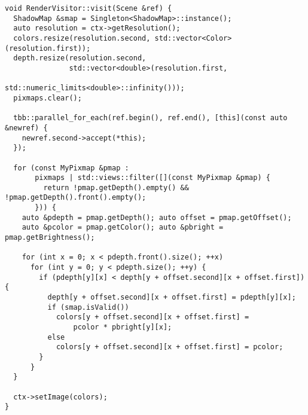 \renewcommand\thechapter{A}


\begin{lstlisting}[caption={Использование RenderVisitor на сцену}, label={lst:render_scene}]
void RenderVisitor::visit(Scene &ref) {
  ShadowMap &smap = Singleton<ShadowMap>::instance();
  auto resolution = ctx->getResolution();
  colors.resize(resolution.second, std::vector<Color>(resolution.first));
  depth.resize(resolution.second,
               std::vector<double>(resolution.first,
                                   std::numeric_limits<double>::infinity()));
  pixmaps.clear();

  tbb::parallel_for_each(ref.begin(), ref.end(), [this](const auto &newref) {
    newref.second->accept(*this);
  });

  for (const MyPixmap &pmap :
       pixmaps | std::views::filter([](const MyPixmap &pmap) {
         return !pmap.getDepth().empty() && !pmap.getDepth().front().empty();
       })) {
    auto &pdepth = pmap.getDepth(); auto offset = pmap.getOffset();
    auto &pcolor = pmap.getColor(); auto &pbright = pmap.getBrightness();

    for (int x = 0; x < pdepth.front().size(); ++x)
      for (int y = 0; y < pdepth.size(); ++y) {
        if (pdepth[y][x] < depth[y + offset.second][x + offset.first]) {
          depth[y + offset.second][x + offset.first] = pdepth[y][x];
          if (smap.isValid())
            colors[y + offset.second][x + offset.first] =
                pcolor * pbright[y][x];
          else
            colors[y + offset.second][x + offset.first] = pcolor;
        }
      }
  }

  ctx->setImage(colors);
}
\end{lstlisting}

